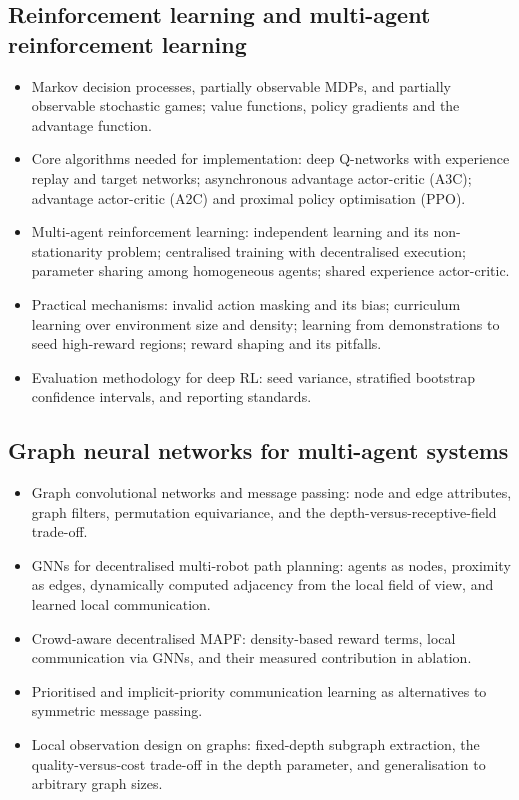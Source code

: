 \subsection{Reinforcement learning and multi-agent reinforcement learning}
\begin{itemize}
  \item Markov decision processes, partially observable MDPs, and partially
        observable stochastic games; value functions, policy gradients and
        the advantage function.
  \item Core algorithms needed for implementation: deep Q-networks with
        experience replay and target networks; asynchronous advantage
        actor-critic (A3C); advantage actor-critic (A2C) and proximal policy
        optimisation (PPO).
  \item Multi-agent reinforcement learning: independent learning and its
        non-stationarity problem; centralised training with decentralised
        execution; parameter sharing among homogeneous agents; shared
        experience actor-critic.
  \item Practical mechanisms: invalid action masking and its bias; curriculum
        learning over environment size and density; learning from
        demonstrations to seed high-reward regions; reward shaping and its
        pitfalls.
  \item Evaluation methodology for deep RL: seed variance, stratified
        bootstrap confidence intervals, and reporting standards.
\end{itemize}

\subsection{Graph neural networks for multi-agent systems}
\begin{itemize}
  \item Graph convolutional networks and message passing: node and edge
        attributes, graph filters, permutation equivariance, and the
        depth-versus-receptive-field trade-off.
  \item GNNs for decentralised multi-robot path planning: agents as nodes,
        proximity as edges, dynamically computed adjacency from the local
        field of view, and learned local communication.
  \item Crowd-aware decentralised MAPF: density-based reward terms, local
        communication via GNNs, and their measured contribution in ablation.
  \item Prioritised and implicit-priority communication learning as
        alternatives to symmetric message passing.
  \item Local observation design on graphs: fixed-depth subgraph extraction,
        the quality-versus-cost trade-off in the depth parameter, and
        generalisation to arbitrary graph sizes.
\end{itemize}

